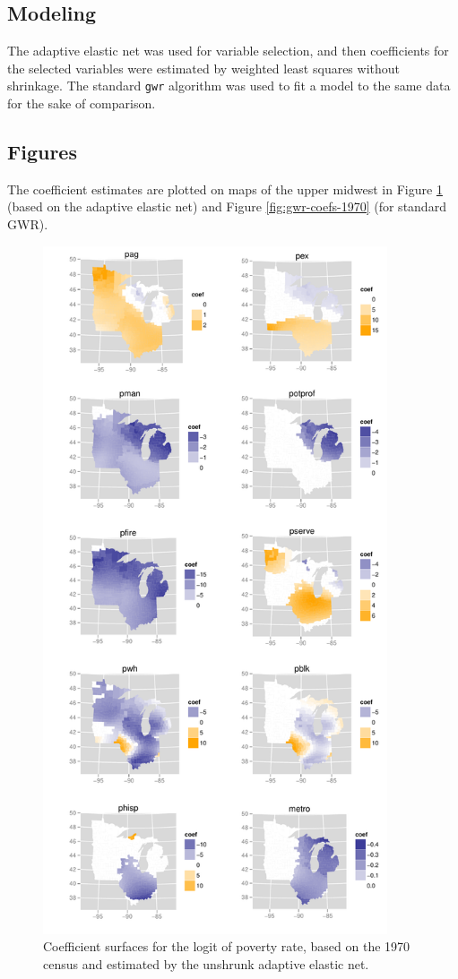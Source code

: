 \documentclass[authoryear, review, 11pt]{elsarticle}
\begin{document}
	\subsection{Modeling}	
	The adaptive elastic net was used for variable selection, and then coefficients for the selected variables were estimated by weighted least squares without shrinkage. The standard \verb!gwr! algorithm was used to fit a model to the same data for the sake of comparison.
	
	\subsection{Figures}
	The coefficient estimates are plotted on maps of the upper midwest in Figure \ref{fig:unshrunk-enet-coefs-1970} (based on the adaptive elastic net) and Figure \ref{fig:gwr-coefs-1970} (for standard GWR).
	\begin{figure}
		\begin{center}
			\includegraphics[height=8in]{../../figures/poverty/1970.linear.coefficients.unshrunk.pdf}
			\caption{Coefficient surfaces for the logit of poverty rate, based on the 1970 census and estimated by the unshrunk adaptive elastic net. \label{fig:unshrunk-enet-coefs-1970}}
		\end{center}
	\end{figure}	
	
\end{document}

